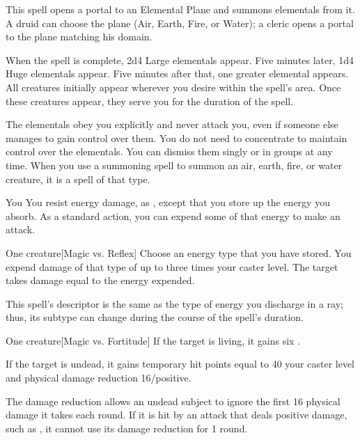 \spelldur{\durlong \dismissable}
\spellline
\spelleffect This spell opens a portal to an Elemental Plane and summons elementals from it. A druid can choose the plane (Air, Earth, Fire, or Water); a cleric opens a portal to the plane matching his domain.
\par When the spell is complete, 2d4 Large elementals appear. Five minutes later, 1d4 Huge elementals appear. Five minutes after that, one greater elemental appears. All creatures initially appear wherever you desire within the spell's area. Once these creatures appear, they serve you for the duration of the spell.
\par The elementals obey you explicitly and never attack you, even if someone else manages to gain control over them. You do not need to concentrate to maintain control over the elementals. You can dismiss them singly or in groups at any time.
\spellnotes When you use a summoning spell to summon an air, earth, fire, or water creature, it is a spell of that type.

\begin{spelltarget}{You}
    \spelleffect You resist energy damage, as , except that you store up the energy you absorb. As a standard action, you can expend some of that energy to make an attack.
\end{spelltarget}
\begin{spelltarget}{One creature}[Magic vs. Reflex]
    \spelleffect Choose an energy type that you have stored. You expend damage of that type of up to three times your caster level.
    \spellsuccess The target takes damage equal to the energy expended.
\end{spelltarget}
\spellnotes This spell's descriptor is the same as the type of energy you discharge in a ray; thus, its subtype can change during the course of the spell's duration.

\spellrng{\rngclose}
\spelldur{\durshort}
\begin{spelltarget}{One creature}[Magic vs. Fortitude]
    \spelleffect If the target is living, it gains six \negativelevels.

    \spelleffect If the target is undead, it gains temporary hit points equal to 40 \add your caster level and physical damage reduction 16/positive.
\end{spelltarget}
\spellnotes The damage reduction allows an undead subject to ignore the first 16 physical damage it takes each round. If it is hit by an attack that deals positive damage, such as , it cannot use its damage reduction for 1 round.

